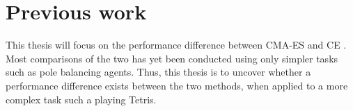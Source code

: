 \section*{Previous work}

This thesis will focus on the performance difference between
CMA-ES and CE  \citep{cetut:14}. Most comparisons of the two 
has yet been conducted using only simpler tasks such as
pole balancing agents\citep{heidrich-meisner:09}. Thus, this thesis is to 
uncover whether a performance difference exists between the
two methods, when applied to a more complex task such a playing Tetris.

